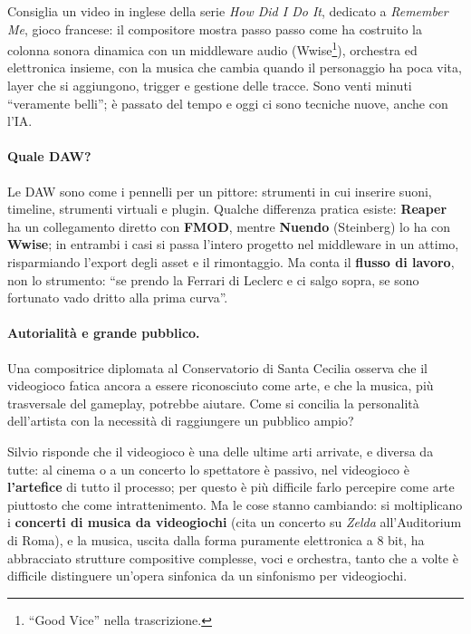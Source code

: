 Consiglia un video in inglese della serie \emph{How Did I Do It}, dedicato a
\emph{Remember Me}, gioco francese: il compositore mostra passo passo come ha
costruito la colonna sonora dinamica con un middleware audio (Wwise\footnote{
``Good Vice'' nella trascrizione.}), orchestra ed elettronica insieme, con la
musica che cambia quando il personaggio ha poca vita, layer che si aggiungono,
trigger e gestione delle tracce. Sono venti minuti ``veramente belli''; è passato
del tempo e oggi ci sono tecniche nuove, anche con l'IA.

\paragraph{Quale DAW?} Le DAW sono come i pennelli per un pittore: strumenti in
cui inserire suoni, timeline, strumenti virtuali e plugin. Qualche differenza
pratica esiste: \textbf{Reaper} ha un collegamento diretto con \textbf{FMOD},
mentre \textbf{Nuendo} (Steinberg) lo ha con \textbf{Wwise}; in entrambi i casi
si passa l'intero progetto nel middleware in un attimo, risparmiando l'export degli
asset e il rimontaggio. Ma conta il \textbf{flusso di lavoro}, non lo strumento:
``se prendo la Ferrari di Leclerc e ci salgo sopra, se sono fortunato vado
dritto alla prima curva''.

\paragraph{Autorialità e grande pubblico.} Una compositrice diplomata al
Conservatorio di Santa Cecilia osserva che il videogioco fatica ancora a essere
riconosciuto come arte, e che la musica, più trasversale del gameplay, potrebbe
aiutare. Come si concilia la personalità dell'artista con la necessità di
raggiungere un pubblico ampio?

Silvio risponde che il videogioco è una delle ultime arti arrivate, e diversa da
tutte: al cinema o a un concerto lo spettatore è passivo, nel videogioco è
\textbf{l'artefice} di tutto il processo; per questo è più difficile farlo
percepire come arte piuttosto che come intrattenimento. Ma le cose stanno
cambiando: si moltiplicano i \textbf{concerti di musica da videogiochi} (cita un
concerto su \emph{Zelda} all'Auditorium di Roma), e la musica, uscita dalla forma
puramente elettronica a 8 bit, ha abbracciato strutture compositive complesse,
voci e orchestra, tanto che a volte è difficile distinguere un'opera sinfonica da
un sinfonismo per videogiochi.

